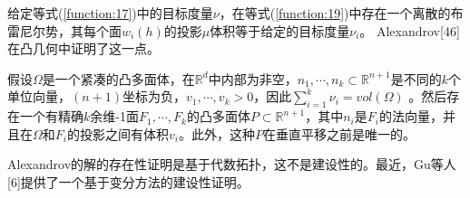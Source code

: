 给定等式(\ref{function:17})中的目标度量$\nu$，在等式(\ref{function:19})中存在一个离散的布雷尼尔势，其每个面$w_i(h)$的投影$\mu$体积等于给定的目标度量$\nu _i$。 Alexandrov[46]在凸几何中证明了这一点。
\begin{theorem}[Alexandrov【46】] \label{theorem:4.1}
	假设$\Omega$是一个紧凑的凸多面体，在$\mathbb{R}^d$中内部为非空，$n_1,\cdots, n_k \subset \mathbb{R}^{n+1}$是不同的$k$个单位向量，$(n+1)$坐标为负，$v_1,\cdots, v_k > 0$，因此$\sum_{i=1}^{k} \nu _i= vol(\Omega)$ 。然后存在一个有精确$k$余维-1面$F_1, \cdots ,F_k$的凸多面体$P \subset \mathbb{R}^{n+1}$，其中$n_i$是$F_i$的法向量，并且在$\Omega$和$F_i$的投影之间有体积$v_i$。此外，这种$P$在垂直平移之前是唯一的。
	
	Alexandrov的解的存在性证明是基于代数拓扑，这不是建设性的。最近，Gu等人[6]提供了一个基于变分方法的建设性证明。
\end{theorem}

